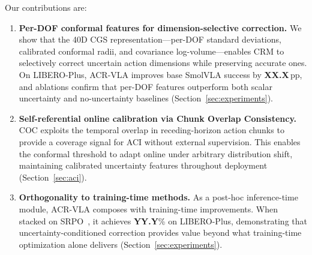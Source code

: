 Our contributions are:
\begin{enumerate}[leftmargin=*,nosep]
  \item \textbf{Per-DOF conformal features for dimension-selective correction.}
  We show that the 40D CGS representation---per-DOF standard deviations, calibrated conformal radii, and covariance log-volume---enables CRM to selectively correct uncertain action dimensions while preserving accurate ones.
  On LIBERO-Plus, ACR-VLA improves base SmolVLA success by \textbf{XX.X}\,pp, and ablations confirm that per-DOF features outperform both scalar uncertainty and no-uncertainty baselines (Section~\ref{sec:experiments}).

  \item \textbf{Self-referential online calibration via Chunk Overlap Consistency.}
  COC exploits the temporal overlap in receding-horizon action chunks to provide a coverage signal for ACI without external supervision.
  This enables the conformal threshold to adapt online under arbitrary distribution shift, maintaining calibrated uncertainty features throughout deployment (Section~\ref{sec:aci}).

  \item \textbf{Orthogonality to training-time methods.}
  As a post-hoc inference-time module, ACR-VLA composes with training-time improvements.
  When stacked on SRPO~\cite{srpo2025}, it achieves \textbf{YY.Y}\% on LIBERO-Plus, demonstrating that uncertainty-conditioned correction provides value beyond what training-time optimization alone delivers (Section~\ref{sec:experiments}).
\end{enumerate}
